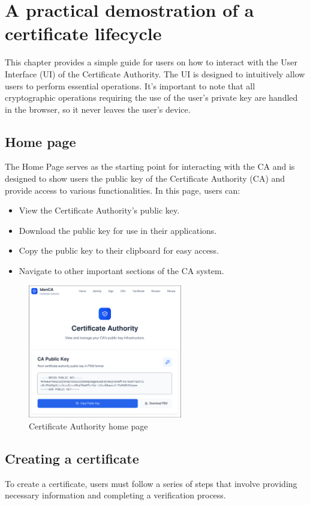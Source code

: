 \chapter{A practical demostration of a certificate lifecycle}

This chapter provides a simple guide for users on how to interact with the User Interface (UI) 
of the Certificate Authority. The UI is designed to intuitively 
allow users to perform essential operations. It's important to note that all cryptographic operations
requiring the use of the user's private key are handled in the browser, so it never leaves the 
user's device.

\section{Home page}
The Home Page serves as the starting point for interacting with the CA and is designed to show 
users the public key of the Certificate Authority (CA) and provide access to various functionalities.
In this page, users can:
\begin{itemize}
    \item View the Certificate Authority's public key.
    \item Download the public key for use in their applications.
    \item Copy the public key to their clipboard for easy access.
    \item Navigate to other important sections of the CA system.
\end{itemize}
\begin{figure}[h!]
    \centering
    \includegraphics[keepaspectratio, width=0.6\textwidth]{Pic/1_ca_pub_key.png}
    \caption{Certificate Authority home page}
    \label{fig:homepage}
\end{figure}

\section{Creating a certificate}
To create a certificate, users must follow a series of steps that involve providing necessary 
information and completing a verification process. 
